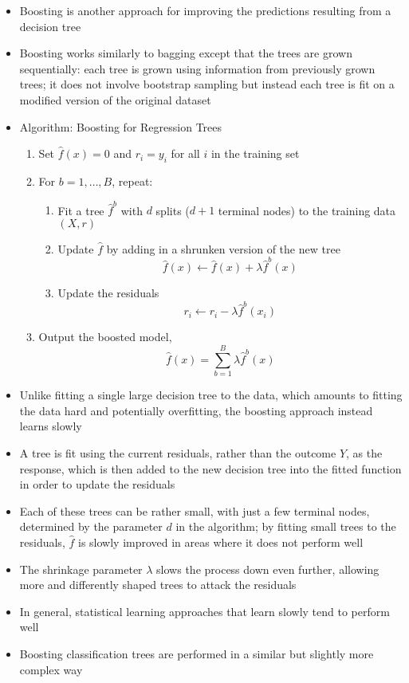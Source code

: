 \documentclass[12pt]{article}
\begin{document}
\begin{itemize}
\item Boosting is another approach for improving the predictions resulting from a decision tree 
\item Boosting works similarly to bagging except that the trees are grown sequentially: each tree is grown using information from previously grown trees; it does not involve bootstrap sampling but instead each tree is fit on a modified version of the original dataset 
\item Algorithm: Boosting for Regression Trees \begin{enumerate} 
\item Set $\hat{f}(x) = 0$ and $r_i = y_i$ for all $i$ in the training set 
\item For $b=1,\dots,B$, repeat: \begin{enumerate} 
\item Fit a tree $\hat{f}^{b}$ with $d$ splits ($d+1$ terminal nodes) to the training data $(X,r)$
\item Update $\hat{f}$ by adding in a shrunken version of the new tree $$ \hat{f}(x) \leftarrow \hat{f}(x) + \lambda\hat{f}^b(x) $$ 
\item Update the residuals $$ r_i \leftarrow r_i - \lambda\hat{f}^b(x_i) $$ \end{enumerate} 
\item Output the boosted model, $$ \hat{f}(x) = \sum_{b=1}^B \lambda\hat{f}^b(x) $$ \end{enumerate} 
\item Unlike fitting a single large decision tree to the data, which amounts to fitting the data hard and potentially overfitting, the boosting approach instead learns slowly 
\item A tree is fit using the current residuals, rather than the outcome $Y$, as the response, which is then added to the new decision tree into the fitted function in order to update the residuals 
\item Each of these trees can be rather small, with just a few terminal nodes, determined by the parameter $d$ in the algorithm; by fitting small trees to the residuals, $\hat{f}$ is slowly improved in areas where it does not perform well 
\item The shrinkage parameter $\lambda$ slows the process down even further, allowing more and differently shaped trees to attack the residuals 
\item In general, statistical learning approaches that learn slowly tend to perform well 
\item Boosting classification trees are performed in a similar but slightly more complex way 

\end{itemize}
\end{document}
